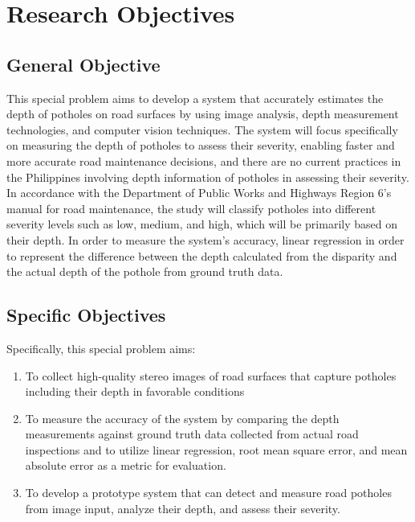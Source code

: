\section{Research Objectives}
\label{sec:researchobjectives}

\subsection{General Objective}
\label{sec:generalobjective}

This special problem aims to develop a system that accurately estimates the depth of potholes on road surfaces by using image analysis, depth measurement technologies, and computer vision techniques. The system will focus specifically on measuring the depth of potholes to assess their severity, enabling faster and more accurate road maintenance decisions, and there are no current practices in the Philippines involving depth information of potholes in assessing their severity. In accordance with the Department of Public Works and Highways Region 6’s manual for road maintenance, the study will classify potholes into different severity levels such as low, medium, and high, which will be primarily based on their depth. In order to measure the system's accuracy, linear regression in order to represent the difference between the depth calculated from the disparity and the actual depth of the pothole from ground truth data.

\subsection{Specific Objectives}
\label{sec:specificobjectives}

Specifically, this special problem aims:
\begin{enumerate}
	\item To collect high-quality stereo images of road surfaces that capture potholes including their depth in favorable conditions
	\item To measure the accuracy of the system by comparing the depth measurements against ground truth data collected from actual road inspections and to utilize linear regression, root mean square error, and mean absolute error as a metric for evaluation.
	\item To develop a prototype system that can detect and measure road potholes from image input, analyze their depth, and assess their severity.
\end{enumerate}

